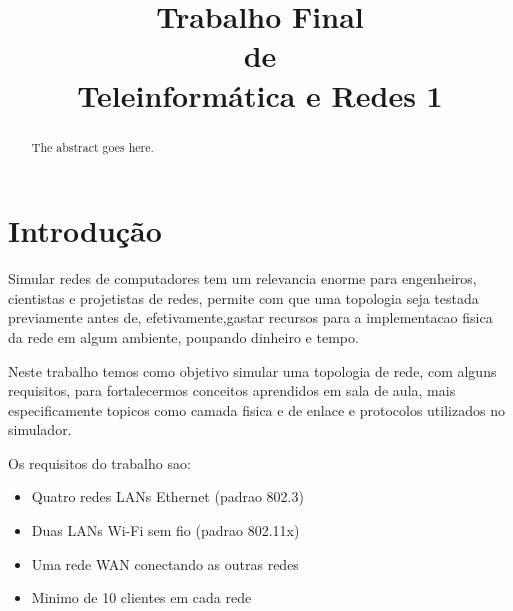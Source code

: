 \documentclass[conference]{IEEEtran}
\begin{document}
\title{Trabalho Final \\
	de \\
	Teleinformática e Redes 1}

\author{
\and
{}
\and
{}
}

\maketitle

\begin{abstract}
The abstract goes here.
\end{abstract}

\IEEEpeerreviewmaketitle

\section{Introdução}
	Simular redes de computadores tem um relevancia enorme para engenheiros, cientistas e projetistas de redes, permite com que uma topologia seja testada previamente antes de, efetivamente,gastar recursos para a implementacao fisica da rede em algum ambiente, poupando dinheiro e tempo.
	
	Neste trabalho temos como objetivo simular uma topologia de rede, com alguns requisitos, para fortalecermos conceitos aprendidos em sala de aula, mais especificamente topicos como camada fisica e de enlace e protocolos utilizados no simulador.
	
	Os requisitos do trabalho sao:
	
	\begin{itemize}
		\item Quatro redes LANs Ethernet (padrao 802.3) 
		\item Duas LANs Wi-Fi sem fio (padrao 802.11x)
		\item Uma rede WAN conectando as outras redes
		\item Minimo de 10 clientes em cada rede
	\end{itemize}
\end{document}
